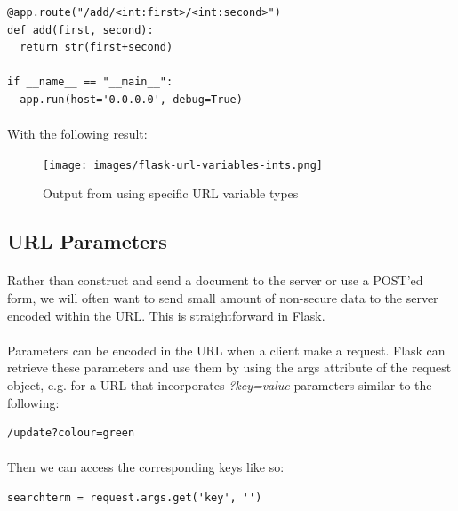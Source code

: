 \documentclass[12pt, a4paper, oneside]{book}
\begin{document}
{\begin{lstlisting}
@app.route("/add/<int:first>/<int:second>")
def add(first, second):
  return str(first+second)

if __name__ == "__main__":
  app.run(host='0.0.0.0', debug=True)
\end{lstlisting}

\paragraph{} With the following result:

\begin{figure}[H]
\centering
\texttt{[image: images/flask-url-variables-ints.png]}
\caption{Output from using specific URL variable types}
\label{fig:flask-url-variables-ints}
\end{figure}



\subsection{URL Parameters}
\label{url-parameters}
\paragraph{} Rather than construct and send a document to the server or use a POST'ed form, we will often want to send small amount of non-secure data to the server encoded within the URL. This is straightforward in Flask. 

\paragraph{} Parameters can be encoded in the URL when a client make a request. Flask can retrieve these parameters and use them by using the args attribute of the request object, e.g. for a URL that incorporates \emph{?key=value} parameters similar to the following:

\begin{lstlisting}[style=DOS]
/update?colour=green
\end{lstlisting}

\paragraph{} Then we can access the corresponding keys like so:

\begin{lstlisting}
searchterm = request.args.get('key', '')
\end{lstlisting}

}
\end{document}
